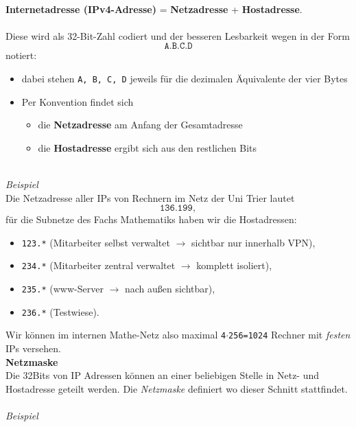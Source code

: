 ~\\
\textbf{Internetadresse (IPv4-Adresse)} = \textbf{Netzadresse} + \textbf{Hostadresse}.\\~\\[-0.2cm]
Diese wird als 32-Bit-Zahl codiert und der besseren Lesbarkeit wegen in der Form
$$\texttt{A.B.C.D}$$
notiert:
\begin{itemize}
	\item dabei stehen \texttt{A, B, C, D} jeweils für die dezimalen Äquivalente der vier Bytes
	\item Per Konvention findet sich
	\begin{itemize}
		\item die \textbf{Netzadresse} am Anfang der Gesamtadresse
		\item die \textbf{Hostadresse} ergibt sich aus den restlichen Bits
	\end{itemize}
\end{itemize}
~\\
\textit{Beispiel}\\
Die Netzadresse aller IPs von Rechnern im Netz der Uni Trier lautet
$$\texttt{136.199},$$
für die Subnetze des Fachs Mathematiks haben wir die Hostadressen:
\begin{itemize}
	\item \texttt{123.*} (Mitarbeiter selbst verwaltet $\to$ sichtbar nur innerhalb VPN),
	\item \texttt{234.*} (Mitarbeiter zentral verwaltet $\to$ komplett isoliert),
	\item \texttt{235.*} (www-Server $\to$ nach außen sichtbar),
	\item \texttt{236.*} (Testwiese).
\end{itemize}
Wir können im internen Mathe-Netz also maximal \texttt{4$\cdot$256=1024} Rechner mit \textit{festen} IPs versehen.
%
~\\
\textbf{Netzmaske}\\
Die 32Bits von IP Adressen können an einer beliebigen Stelle in Netz- und Hostadresse geteilt werden. Die \textit{Netzmaske} definiert wo dieser Schnitt stattfindet.\\~\\
\textit{Beispiel}\\
